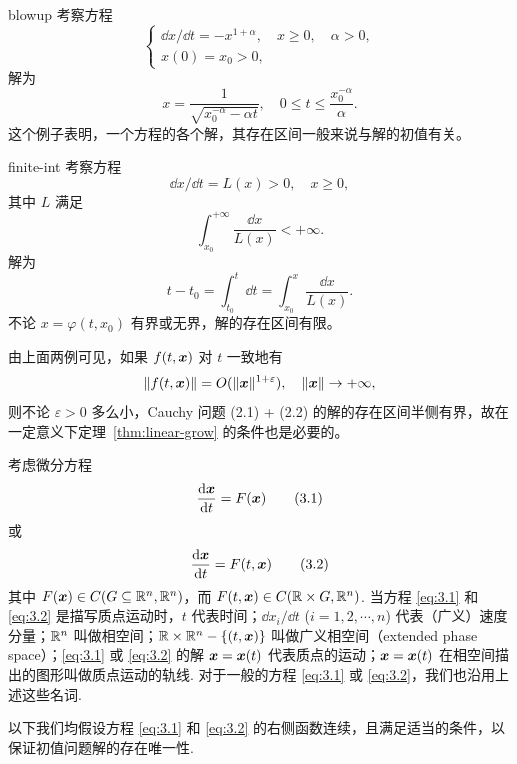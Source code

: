 

\begin{example}{}{blowup}
考察方程
\[
\begin{cases}
\dd x/\dd t = -x^{1+\alpha}, \quad x \geq 0, \quad \alpha > 0, \\
x(0) = x_0 > 0,
\end{cases}
\]
解为
\[
x = \frac{1}{\sqrt{x_0^{-\alpha} - \alpha t}}, \quad 0 \leq t \leq \frac{x_0^{-\alpha}}{\alpha}.
\]
这个例子表明，一个方程的各个解，其存在区间一般来说与解的初值有关。
\end{example}

\begin{example}{}{finite-int}
考察方程
\[
\dd x/\dd t = L(x) > 0, \quad x \geq 0,
\]
其中 $L$ 满足
\[
\int_{x_0}^{+\infty} \frac{\dd x}{L(x)} < +\infty.
\]
解为
\[
t - t_0 = \int_{t_0}^t \dd t = \int_{x_0}^x \frac{\dd x}{L(x)}.
\]
不论 $x = \varphi(t, x_0)$ 有界或无界，解的存在区间有限。
\end{example}

由上面两例可见，如果 $f(t, \boldsymbol{x})$ 对 $t$ 一致地有
\[
\|f(t, \boldsymbol{x})\| = O(\|\boldsymbol{x}\|^{1+\varepsilon}), \quad \|\boldsymbol{x}\| \to +\infty,
\]
则不论 $\varepsilon > 0$ 多么小，Cauchy 问题 (2.1) + (2.2) 的解的存在区间半侧有界，故在一定意义下定理~\ref{thm:linear-grow} 的条件也是必要的。


考虑微分方程
\[
\frac{\mathrm{d} \boldsymbol{x}}{\mathrm{d} t} = F(\boldsymbol{x}) \tag{3.1}\label{eq:3.1}
\]
或
\[
\frac{\mathrm{d} \boldsymbol{x}}{\mathrm{d} t} = F(t, \boldsymbol{x}) \tag{3.2}\label{eq:3.2}
\]
其中 $F(\boldsymbol{x}) \in C(G \subseteq \mathbb{R}^n, \mathbb{R}^n)$，而 $F(t, \boldsymbol{x}) \in C(\mathbb{R} \times G, \mathbb{R}^n)$. 当方程 \eqref{eq:3.1} 和 \eqref{eq:3.2} 是描写质点运动时，$t$ 代表时间；$\dd x_i/\dd t$ ($i = 1, 2, \cdots, n$) 代表（广义）速度分量；$\mathbb{R}^n$ 叫做相空间；$\mathbb{R} \times \mathbb{R}^n - \{(t, \boldsymbol{x})\}$ 叫做广义相空间（extended phase space）；\eqref{eq:3.1} 或 \eqref{eq:3.2} 的解 $\boldsymbol{x} = \boldsymbol{x}(t)$ 代表质点的运动；$\boldsymbol{x} = \boldsymbol{x}(t)$ 在相空间描出的图形叫做质点运动的轨线. 对于一般的方程 \eqref{eq:3.1} 或 \eqref{eq:3.2}，我们也沿用上述这些名词.

以下我们均假设方程 \eqref{eq:3.1} 和 \eqref{eq:3.2} 的右侧函数连续，且满足适当的条件，以保证初值问题解的存在唯一性.


